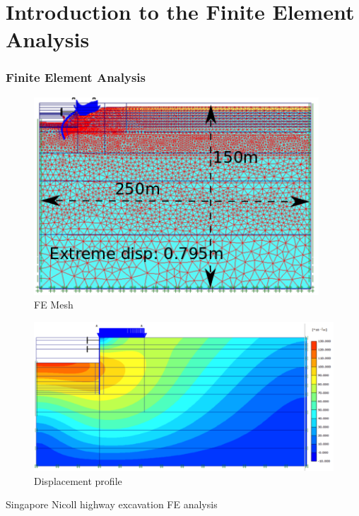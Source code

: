 \documentclass[notes]{beamer}
\begin{document}
\section{Introduction to the Finite Element Analysis}
\begin{frame}
\frametitle{Finite Element Analysis}
 \noindent
\fboxsep=0pt
\noindent
\begin{minipage}[t]{0.42\linewidth}
	\begin{figure}
		\includegraphics[width=0.95\textwidth]{figs/fea-geotech-mesh.png}
		\caption{FE Mesh}
	\end{figure}
\end{minipage}%
\hfill
\begin{minipage}[t]{0.56\linewidth}
	\begin{figure}
		\includegraphics[width=\textwidth]{figs/fea-geotech.png}
		\caption{Displacement profile}
	\end{figure}
\end{minipage}
\centering
Singapore Nicoll highway excavation FE analysis
\end{frame}
\end{document}
